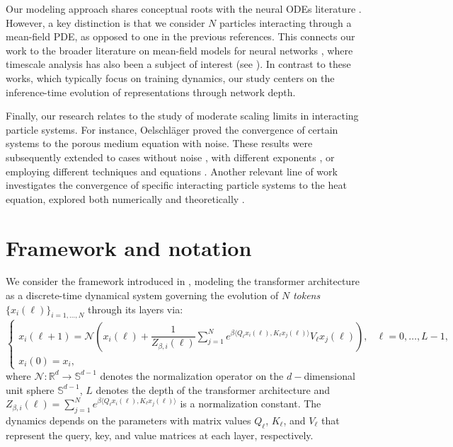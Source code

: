 \documentclass{article}
\numberwithin{theorem}{section}
\begin{document}
Our modeling approach shares conceptual roots with the neural ODEs literature \cite{chen2018neural, weinan2017proposal}. However, a key distinction is that we consider $N$ particles interacting through a mean-field PDE, as opposed to one in the previous references. This connects our work to the broader literature on mean-field models for neural networks \cite{rotskoff2022trainability, mei2018mean, chizat2018global, agazzi21, de2020quantitative}, where timescale analysis has also been a subject of interest (see \cite{berthier2024learning}). In contrast to these works, which typically focus on training dynamics, our study centers on the inference-time evolution of representations through network depth.

Finally, our research relates to the study of moderate scaling limits in interacting particle systems. For instance, Oelschläger \cite{oelschlager1985law} proved the convergence of certain systems to the porous medium equation with noise. These results were subsequently extended to cases without noise \cite{oelschlager2001sequence, oelschlager1990large}, with different exponents \cite{figalli2008convergence}, or employing different techniques and equations \cite{carrillo2019blob,burger2023porous, paul2025universal}. Another relevant line of work investigates the convergence of specific interacting particle systems to the heat equation, explored both numerically and theoretically \citep{degond1990deterministic, brenier2017geometric,lions2001methode}.


\section{Framework and notation}\label{sec:framework}
We consider the framework introduced in \cite{sander2022sinkformers, geshkovski2023mathematical, geshkovski2024emergence}, modeling the transformer architecture as a discrete-time dynamical system governing the evolution of $N$ \emph{tokens} $\{x_i(\ell)\}_{i = 1, \ldots, N}$ through its layers via:
\begin{equation}\label{eq:discrete}
\begin{cases}
x_i(\ell+1) = \mathcal{N}\left(x_i(\ell) + \dfrac{1}{Z_{\beta,i}(\ell)}\sum_{j=1}^N e^{\beta\langle Q_\ell x_i(\ell), K_\ell x_j(\ell)\rangle} V_\ell x_j(\ell) \right), & \ell=0,\ldots,L-1,\\
x_i(0) = x_i,
\end{cases}
\end{equation}
where $\mathcal{N}:\mathbb{R}^d\to\mathbb{S}^{d-1}$ denotes the normalization operator on the $d-$dimensional unit sphere $\mathbb{S}^{d-1}$, $L$ denotes the depth of the transformer architecture and $Z_{\beta,i}(\ell)=\sum_{j=1}^N e^{\beta \langle Q_\ell x_i(\ell), K_\ell x_j(\ell)\rangle}$ is a normalization constant. The dynamics depends on the parameters with matrix values $Q_\ell$, $K_\ell$, and $V_\ell$ that represent the query, key, and value matrices at each layer, respectively.
\end{document}
